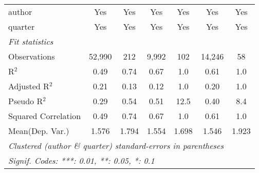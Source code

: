 \begin{tabular}{lcccccc}
   author                                                     & Yes            & Yes           & Yes            & Yes            & Yes          & Yes\\  
   quarter                                                    & Yes            & Yes           & Yes            & Yes            & Yes          & Yes\\  
   \midrule
   \emph{Fit statistics}\\
   Observations                                               & 52,990         & 212           & 9,992          & 102            & 14,246       & 58\\  
   R$^2$                                                      & 0.49           & 0.74          & 0.67           & 1.0            & 0.61         & 1.0\\  
   Adjusted R$^2$                                             & 0.21           & 0.13          & 0.12           & 1.0            & 0.20         & 1.0\\  
   Pseudo R$^2$                                               & 0.29           & 0.54          & 0.51           & 12.5           & 0.40         & 8.4\\  
   Squared Correlation                                        & 0.49           & 0.74          & 0.67           & 1.0            & 0.61         & 1.0\\  
Mean(Dep. Var.) & 1.576 & 1.794 & 1.554 & 1.698 & 1.546 & 1.923 \\
   \midrule \midrule
   \multicolumn{7}{l}{\emph{Clustered (author \& quarter) standard-errors in parentheses}}\\
   \multicolumn{7}{l}{\emph{Signif. Codes: ***: 0.01, **: 0.05, *: 0.1}}\\
\end{tabular}
\par\endgroup
